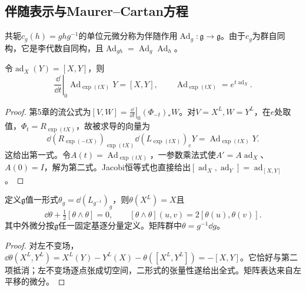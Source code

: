 \subsection{伴随表示与Maurer--Cartan方程}
\begin{definition}
共轭$c_g(h)=ghg^{-1}$的单位元微分称为伴随作用$\operatorname{Ad}_g:\mathfrak g\to\mathfrak g$。由于$c_g$为群自同构，它是李代数自同构，且$\operatorname{Ad}_{gh}=\operatorname{Ad}_g\operatorname{Ad}_h$。
\end{definition}
\begin{proposition}\label{prop:lie-ad}
令$\operatorname{ad}_X(Y)=[X,Y]$，则
\[
 \left.\frac{\dd}{\dd t}\right|_0\operatorname{Ad}_{\exp(tX)}Y=[X,Y],\qquad
 \operatorname{Ad}_{\exp(tX)}=e^{t\operatorname{ad}_X}.
\]
\end{proposition}
\begin{proof}
第5章的流公式为$[V,W]=\left.\frac{\dd}{\dd t}\right|_0(\Phi_{-t})_*W$。对$V=X^L,W=Y^L$，在$e$处取值，$\Phi_t=R_{\exp(tX)}$，故被求导的向量为
\[
 \dd(R_{\exp(-tX)})_{\exp(tX)}\dd(L_{\exp(tX)})_eY
 =\operatorname{Ad}_{\exp(tX)}Y.
\]
这给出第一式。令$A(t)=\operatorname{Ad}_{\exp(tX)}$，一参数乘法式使$A'=A\operatorname{ad}_X$、$A(0)=I$，解为第二式。Jacobi恒等式也直接给出$[\operatorname{ad}_X,\operatorname{ad}_Y]=\operatorname{ad}_{[X,Y]}$。
\end{proof}

\begin{proposition}\label{prop:lie-maurer-cartan}
定义$\mathfrak g$值一形式$\theta_g=\dd(L_{g^{-1}})_g$，则$\theta(X^L)=X$且
\begin{equation}\label{eq:lie-maurer-cartan}
 \dd\theta+\tfrac12[\theta\wedge\theta]=0,
 \qquad [\theta\wedge\theta](u,v)=2[\theta(u),\theta(v)].
\end{equation}
其中外微分按$\mathfrak g$任一固定基逐分量定义。矩阵群中$\theta=g^{-1}\dd g$。
\end{proposition}
\begin{proof}
对左不变场，$\dd\theta(X^L,Y^L)=X^L(Y)-Y^L(X)-\theta([X^L,Y^L])=-[X,Y]$。它恰好与第二项抵消；左不变场逐点张成切空间，二形式的张量性遂给出全式。矩阵表达来自左平移的微分。
\end{proof}

